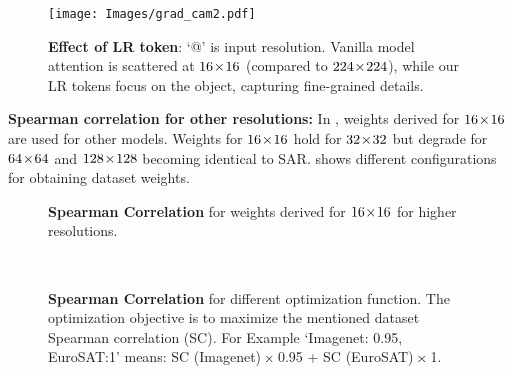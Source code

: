 \begin{figure}[!t]
\centering
{}
\hfill
\subfloat
{
\texttt{[image: Images/grad\_cam2.pdf]}
}
\caption{ 
\textbf{Effect of LR token}: `@' is input resolution. Vanilla model attention is scattered at $16\!\times\!16$ (compared to $224\!\times\!224$), while our LR tokens focus on the object, capturing fine-grained details.
}
\label{fig:gram_cam_results_supp}
 \vspace{-8pt}
\end{figure}


\noindent \textbf{Spearman correlation for other resolutions:}
In \textbf{}, weights derived for $16\!\times\!16$ are used for other models. Weights for $16\!\times\!16$ hold for $32\!\times\!32$ but degrade for $64\!\times\!64$ and $128\!\times\!128$ becoming identical to SAR.
\textbf{} shows different configurations for obtaining dataset weights. 


\begin{figure}[!t]
\centering
{}
\hfill
{}
\hfill
{}
\caption{\textbf{Spearman Correlation} for weights derived for $16\!\times\!16$ for higher resolutions.
}    
\label{fig:Sr_images_supp_16}
\end{figure}


\begin{figure}[!t]
\centering
{}
\\
\caption{\textbf{Spearman Correlation} for different optimization function.
The optimization objective is to maximize the mentioned dataset Spearman correlation (SC). 
For Example `Imagenet: 0.95, EuroSAT:1' means: SC (Imagenet) $\!\times\!$ 0.95 + SC (EuroSAT) $\!\times\!$ 1. 
}    
\label{fig:diff_optimization_configs}
\end{figure}





